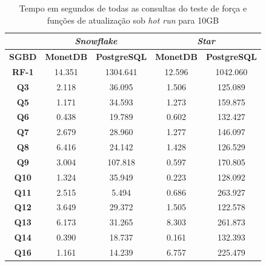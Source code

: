 \begin{table}[t]
        \centering
        \caption{Tempo em segundos de todas as consultas do teste de força e funções de atualização sob \textit{hot run} para 10GB}
        \label{tab:queries_hot_10}
        \begin{tabular}{|c|c|c|c|c|}
        \hline
                & \multicolumn{2}{c|}{\textit{\textbf{Snowflake}}} & \multicolumn{2}{c|}{\textit{\textbf{Star}}} \\ \hline
        \textbf{SGBD}  & \textbf{MonetDB}      & \textbf{PostgreSQL}      & \textbf{MonetDB}    & \textbf{PostgreSQL}   \\ \hline
        \textbf{RF-1}  & 14.351            & 1304.641            & 12.596           & 1042.060            \\ \hline
        \textbf{Q3}    & 2.118             & 36.095              & 1.506            & 125.089             \\ \hline
        \textbf{Q5}    & 1.171             & 34.593              & 1.273            & 159.875             \\ \hline
        \textbf{Q6}    & 0.438             & 19.789              & 0.602            & 132.427             \\ \hline
        \textbf{Q7}    & 2.679             & 28.960              & 1.277            & 146.097             \\ \hline
        \textbf{Q8}    & 6.416             & 24.142              & 1.428            & 126.529             \\ \hline
        \textbf{Q9}    & 3.004             & 107.818             & 0.597            & 170.805             \\ \hline
        \textbf{Q10}   & 1.324             & 35.949              & 0.223            & 128.092             \\ \hline
        \textbf{Q11}   & 2.515             & 5.494               & 0.686            & 263.927             \\ \hline
        \textbf{Q12}   & 3.649             & 29.372              & 1.505            & 122.578             \\ \hline
        \textbf{Q13}   & 6.173             & 31.265              & 8.303            & 261.873             \\ \hline
        \textbf{Q14}   & 0.390             & 18.737              & 0.161            & 132.393             \\ \hline
        \textbf{Q16}   & 1.161             & 14.239              & 6.757            & 225.479             \\ \hline

\end{tabular}
\end{table}
